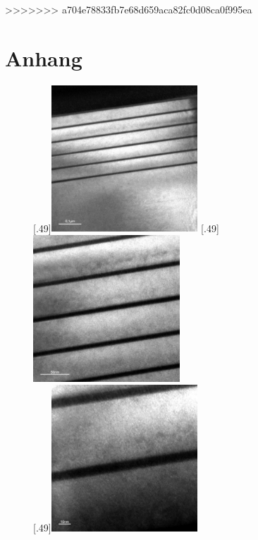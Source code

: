 \documentclass[a4paper,11pt,DIV=11]{scrartcl}
\begin{document}
\newpage

\newpage

\newpage

\newpage
>>>>>>> a704e78833fb7e68d659aca82fc0d08ca0f995ea

\section*{Anhang}

\begin{figure}[htb]\centering
	[.49\linewidth]{\includegraphics[width=0.49\textwidth]{Versuchsdaten/11/34000x.jpg}}
	[.49\linewidth]{\includegraphics[width=0.49\textwidth]{Versuchsdaten/11/87000x.jpg}}\\
	[.49\linewidth]{\includegraphics[width=0.49\textwidth]{Versuchsdaten/11/185000x.jpg}}

\end{figure}
\end{document}
